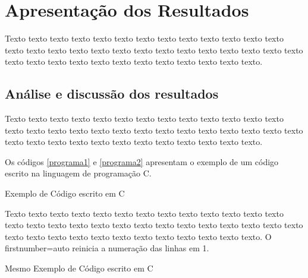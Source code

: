 \chapter{Apresentação dos Resultados}

Texto texto texto texto texto texto texto texto texto texto texto texto texto texto texto texto texto texto texto texto texto texto texto texto texto texto texto texto texto texto texto texto texto texto texto texto texto texto texto.

\section{Análise e discussão dos resultados}

Texto texto texto texto texto texto texto texto texto texto texto texto texto texto texto texto texto texto texto texto texto texto texto texto texto texto texto texto texto texto texto texto texto texto texto texto texto texto texto.

Os  códigos \ref{programa1} e \ref{programa2} apresentam o exemplo de um código escrito na linguagem de programação C.  

\begin{Codigo}[h]

\caption{Exemplo de Código escrito em C}
\label{programa1}
\end{Codigo}

Texto texto texto texto texto texto texto texto texto texto texto texto texto texto texto texto texto texto texto texto texto texto texto texto texto texto texto texto texto texto texto texto texto texto texto texto texto texto texto. O firstnumber=auto reinicia a numeração das linhas em 1.


\begin{Codigo}[h]

\caption{Mesmo Exemplo de Código escrito em C}
\label{programa2}
\end{Codigo}
